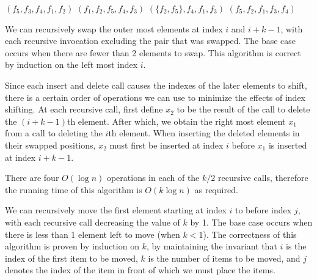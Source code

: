 \documentclass[12pt,twoside]{article}
\begin{document}


\begin{problems}

\problem  %

\begin{problemparts}
\problempart %
\((f_5, f_3, f_4, f_1, f_2)\)
\problempart %
\((f_1, f_2, f_5, f_4, f_3)\)
\problempart %
\((\{f_2, f_5\}, f_4, f_1, f_3)\)
\problempart %
\((f_5, f_2, f_1, f_3, f_4)\)
\end{problemparts}

\newpage
\problem  %

\begin{problemparts}
\problempart %
We can recursively swap the outer most elements at index \(i\) and \(i+k-1\), with each recursive invocation excluding the pair that was swapped. The base case occurs when there are fewer than 2 elements to swap. This algorithm is correct by induction on the left most index \(i\).

Since each insert and delete call causes the indexes of the later elements to shift, there is a certain order of operations we can use to minimize the effects of index shifting. At each recursive call, first define \(x_2\) to be the result of the call to delete the \((i+k-1)\)th element. After which, we obtain the right most element \(x_1\) from a call to deleting the \(i\)th element. When inserting the deleted elements in their swapped positions, \(x_2\) must first be inserted at index \(i\) before \(x_1\) is inserted at index \(i+k-1\).

There are four \(O(\log n)\) operations in each of the \(k/2\) recursive calls, therefore the running time of this algorithm is \(O(k\log n)\) as required.

\problempart %
We can recursively move the first element starting at index \(i\) to before index \(j\), with each recursive call decreasing the value of \(k\) by 1. The base case occurs when there is less than 1 element left to move (when \(k<1\)). The correctness of this algorithm is proven by induction on \(k\), by maintaining the invariant that \(i\) is the index of the first item to be moved, \(k\) is the number of items to be moved, and \(j\) denotes the index of the item in front of which we must place the items.


\end{problemparts}
\end{problems}
\end{document}
